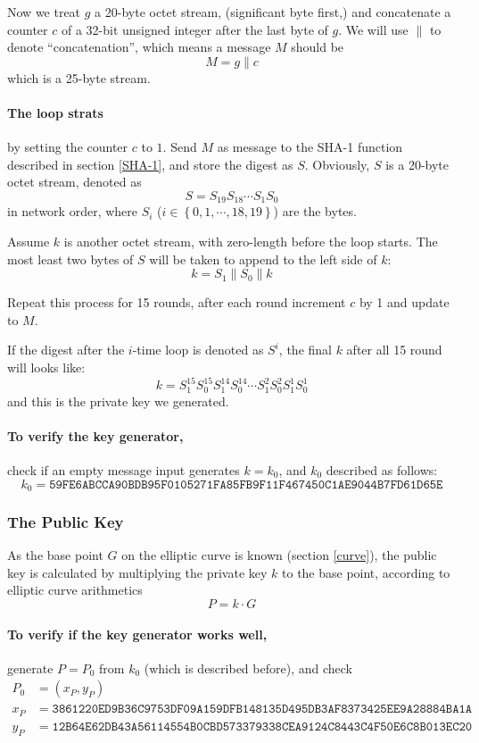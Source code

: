\documentclass[oneside]{article}
\begin{document}
Now we treat $g$ a 20-byte octet stream, (significant byte first,) and concatenate a counter $c$ of a 32-bit unsigned integer after the last byte of $g$.
We will use $\parallel$ to denote ``concatenation'', which means a message $M$ should be
\[M=g\parallel c\]
which is a 25-byte stream.

\paragraph{The loop strats} by setting the counter $c$ to $1$.
Send $M$ as message to the SHA-1 function described in section \ref{SHA-1}, and store the digest as $S$.
Obviously, $S$ is a 20-byte octet stream, denoted as
\[S=S_{19}S_{18}\cdots S_1S_0\]
in network order, where $S_i$ ($i\in\left\{0,1,\cdots,18,19\right\}$) are the bytes.

Assume $k$ is another octet stream, with zero-length before the loop starts.
The most least two bytes of $S$ will be taken to append to the left side of $k$:
\[k=S_1\parallel S_0\parallel k\]

Repeat this process for 15 rounds, after each round increment $c$ by 1 and update to $M$.

If the digest after the $i$-time loop is denoted as $S^i$, the final $k$ after all 15 round will looks like:
\[k=S^{15}_1S^{15}_0S^{14}_1S^{14}_0\cdots S^2_1S^2_0S^1_1S^1_0\]
and this is the private key we generated.

\paragraph{To verify the key generator,} check if an empty message input generates $k=k_0$, and $k_0$ described as follows:
\[k_0=\mathtt{59FE6ABCCA90BDB95F0105271FA85FB9F11F467450C1AE9044B7FD61D65E}\]

\subsubsection{The Public Key}
As the base point $G$ on the elliptic curve is known (section \ref{curve}), the public key is calculated by multiplying the private key $k$ to the base point, according to elliptic curve arithmetics
\[P=k\cdot G\]

\paragraph{To verify if the key generator works well,} generate $P=P_0$ from $k_0$ (which is described before), and check
\begin{align*}
      P_0 & =(x_P,y_P)                                                                 \\
      x_P & =\mathtt{3861220ED9B36C9753DF09A159DFB148135D495DB3AF8373425EE9A28884BA1A} \\
      y_P & =\mathtt{12B64E62DB43A56114554B0CBD573379338CEA9124C8443C4F50E6C8B013EC20}
\end{align*}
\end{document}
